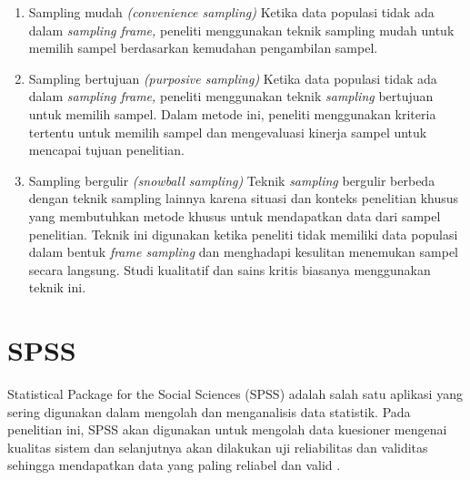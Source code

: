 \begin{enumerate}
	\item Sampling mudah \textit{(convenience sampling)} Ketika data populasi tidak ada dalam \textit{sampling frame,} peneliti menggunakan teknik sampling mudah untuk memilih sampel berdasarkan kemudahan pengambilan sampel. 
	\item Sampling bertujuan \textit{(purposive sampling)} Ketika data populasi tidak ada dalam \textit{sampling frame,} peneliti menggunakan teknik \textit{sampling} bertujuan untuk memilih sampel. Dalam metode ini, peneliti menggunakan kriteria tertentu untuk memilih sampel dan mengevaluasi kinerja sampel untuk mencapai tujuan penelitian. 
	\item Sampling bergulir \textit{(snowball sampling)} Teknik \textit{sampling} bergulir berbeda dengan teknik \textit{}sampling lainnya karena situasi dan konteks penelitian khusus yang membutuhkan metode khusus untuk mendapatkan data dari sampel penelitian. Teknik ini digunakan ketika peneliti tidak memiliki data populasi dalam bentuk \textit{frame sampling} dan menghadapi kesulitan menemukan sampel secara langsung. Studi kualitatif dan sains kritis biasanya menggunakan teknik ini.

\end{enumerate}

\section{SPSS}
Statistical Package for the Social Sciences (SPSS) adalah salah satu aplikasi yang sering digunakan dalam mengolah dan menganalisis data statistik. Pada penelitian ini, SPSS akan digunakan untuk mengolah data kuesioner mengenai kualitas sistem dan selanjutnya akan dilakukan uji reliabilitas dan
validitas sehingga mendapatkan data yang paling reliabel dan valid \cite{sarwono2017mengenal}.
